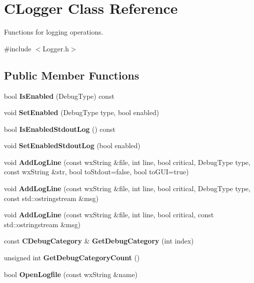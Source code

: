 \section{CLogger Class Reference}
\label{classCLogger}


Functions for logging operations.  


{\ttfamily \#include $<$Logger.h$>$}\subsection*{Public Member Functions}
\begin{DoxyCompactItemize}
\item 
bool {\bf IsEnabled} (DebugType) const \label{classCLogger_ae41ec882b82aee4b05af966b104024c3}

\item 
void {\bf SetEnabled} (DebugType type, bool enabled)\label{classCLogger_a5a7d49880f59003c72658f8dfca3bb2a}

\item 
bool {\bf IsEnabledStdoutLog} () const \label{classCLogger_a3d4483818e83c608399dc607ecbdc273}

\item 
void {\bf SetEnabledStdoutLog} (bool enabled)\label{classCLogger_a42c201d2e7d58bb80659b0553cb239d4}

\item 
void {\bf AddLogLine} (const wxString \&file, int line, bool critical, DebugType type, const wxString \&str, bool toStdout=false, bool toGUI=true)
\item 
void {\bfseries AddLogLine} (const wxString \&file, int line, bool critical, DebugType type, const std::ostringstream \&msg)\label{classCLogger_a979fdb64d5415e3bdfbb9fb5e56e7a96}

\item 
void {\bfseries AddLogLine} (const wxString \&file, int line, bool critical, const std::ostringstream \&msg)\label{classCLogger_ac37cfb74ecf867770a9b1b8119ee35f4}

\item 
const {\bf CDebugCategory} \& {\bf GetDebugCategory} (int index)\label{classCLogger_a2272a95e26a25f087fb3a34c0bc2321f}

\item 
unsigned int {\bf GetDebugCategoryCount} ()\label{classCLogger_a2e660173830efcced89de1bbb8767f44}

\item 
bool {\bf OpenLogfile} (const wxString \&name)\label{classCLogger_a10f7ca1cea6f2c7f29bec770aa548d64}


\end{DoxyCompactItemize}
